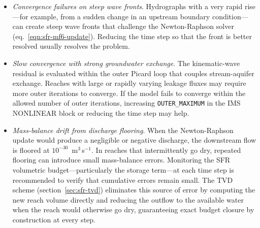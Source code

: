 \begin{itemize}
	\item \textit{Convergence failures on steep wave fronts}. Hydrographs with a very rapid rise---for example, from a sudden change in an upstream boundary condition---can create steep wave fronts that challenge the Newton-Raphson solver (eq.~\ref{eqn:sfr-mf6-update}). Reducing the time step so that the front is better resolved usually resolves the problem.

	\item \textit{Slow convergence with strong groundwater exchange}. The kinematic-wave residual is evaluated within the outer Picard loop that couples stream-aquifer exchange. Reaches with large or rapidly varying leakage fluxes may require more outer iterations to converge. If the model fails to converge within the allowed number of outer iterations, increasing \texttt{OUTER\_MAXIMUM} in the IMS NONLINEAR block or reducing the time step may help.

	\item \textit{Mass-balance drift from discharge flooring}. When the Newton-Raphson update would produce a negligible or negative discharge, the downstream flow is floored at $10^{-30}$~m$^3$\,s$^{-1}$. In reaches that intermittently go dry, repeated flooring can introduce small mass-balance errors. Monitoring the SFR volumetric budget---particularly the storage term---at each time step is recommended to verify that cumulative errors remain small. The TVD scheme (section~\ref{sec:sfr-tvd}) eliminates this source of error by computing the new reach volume directly and reducing the outflow to the available water when the reach would otherwise go dry, guaranteeing exact budget closure by construction at every step.

\end{itemize}
